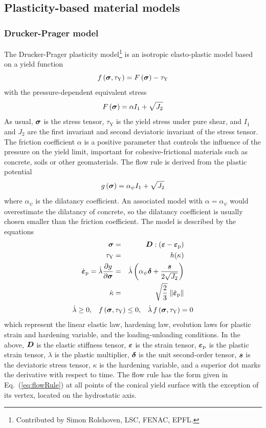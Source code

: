 \documentclass[a4paper]{article}
\newcommand{\mbf}[1]{\mbox{\boldmath$#1$}}
\newcommand{\be}{\begin{equation}}
\newcommand{\ee}{\end{equation}}
\newcommand{\bea}{\begin{eqnarray}}
\newcommand{\eea}{\end{eqnarray}}
\newcommand{\bsig}{\mbf{\sigma}}
\newcommand{\alphaPsi}{\alpha_{\psi}}
\newcommand{\tauY}{\tau_{\mathrm {Y}}}
\newcommand{\eps} {\mbf{\varepsilon}}
\newcommand{\epsp} {\eps_{\mathrm{p}}}
\newcommand{\epspd} {\dot{\eps}_{\mathrm{p}}}
\begin{document}
\subsection{Plasticity-based material models}

\subsubsection{Drucker-Prager model}
The Drucker-Prager plasticity model\footnote{Contributed by Simon Rolshoven, LSC, FENAC, EPFL.} is an isotropic elasto-plastic model based
on a yield function
\be
f \left(\bsig, \tauY\right) = F\left(\bsig\right) - \tauY
\ee
with the pressure-dependent equivalent stress
\be
\label{eq:equivalentStress}
F\left(\bsig\right) = \alpha I_1 + \sqrt{J_2}
\ee
As usual, $\bsig$ is the stress tensor, $\tauY$ is the yield stress
under pure shear, and $I_1$ and $J_2$ are the first invariant and second
deviatoric invariant of the stress tensor.
The friction coefficient $\alpha$ is a positive parameter that
controls the influence of the pressure on the yield limit, important for
cohesive-frictional materials such as concrete, soils or other
geomaterials.
The flow rule is derived from the plastic potential
\be
g\left(\bsig\right) = \alphaPsi I_1 + \sqrt{J_2}
\ee
where $\alphaPsi$ is the dilatancy coefficient. An associated
model with $\alpha=\alphaPsi$ would overestimate the dilatancy of
concrete, so the dilatancy coefficient is usually chosen smaller than the
friction coefficient.
The model is described by the equations
\bea
\label{eq:elasticLaw}
\bsig & = &\mbf{D} : \left(\eps - \epsp \right)
\\
\label{eq:softeningLaw}
\tauY & = & h(\kappa)
\\
\label{eq:flowRule}
\epspd = \dot{\lambda} \frac{\partial g}{\partial \bsig} & = &
\dot{\lambda} \left( \alphaPsi \mbf{\delta} + \frac{\mbf{s}}{2\sqrt{J_2}} \right)
\\
\label{eq:hardening}
\dot{\kappa} & = & \sqrt{\frac{2}{3}} \; \| \epspd \|
\eea
\be
\label{eq:loading}
\dot{\lambda} \ge 0, \;\;\; f \left(\bsig, \tauY\right) \le 0, \;\;\; \dot{\lambda}\, f \left(\bsig, \tauY\right)  = 0
\ee
which represent the linear elastic law, hardening law, evolution laws
for plastic strain and hardening variable,  and the
loading-unloading conditions.
In the above, $\mbf{D}$ is the elastic stiffness
tensor, $\eps$ is the strain tensor, $\epsp$ is the plastic strain tensor,
$\lambda$ is the plastic multiplier, $\mbf{\delta}$ is the unit
second-order tensor, $\mbf{s}$ is the
deviatoric stress tensor, $\kappa$ is the hardening variable, and a
superior dot marks the derivative with respect to time.
The flow rule has the form given in Eq.~(\ref{eq:flowRule}) at all
points of the conical yield surface with the exception of its vertex,
located on the hydrostatic axis.
\end{document}
